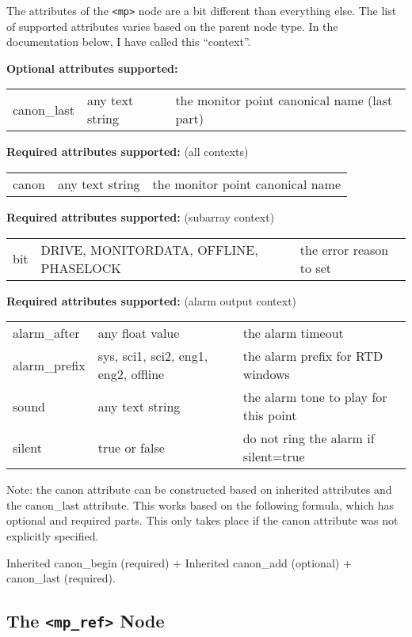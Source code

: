 \documentclass[letterpaper,12pt,oneside,pdftex]{article}
\newcommand{\optattrs}{\textbf{Optional attributes supported:}}
\newcommand{\reqattrs}{\textbf{Required attributes supported:}}
\begin{document}
The attributes of the \verb|<mp>| node are a bit different than everything else.
The list of supported attributes varies based on the parent node type. In the
documentation below, I have called this ``context''.

\optattrs \\
\begin{tabular}{lll}
canon\_last & any text string   & the monitor point canonical name (last part) \\
\end{tabular}

\reqattrs{} (all contexts) \\
\begin{tabular}{lll}
canon       & any text string   & the monitor point canonical name \\
\end{tabular}

\reqattrs{} (subarray context) \\
\begin{tabular}{lll}
bit & DRIVE, MONITORDATA, OFFLINE, PHASELOCK & the error reason to set \\
\end{tabular}

\reqattrs{} (alarm output context) \\
\begin{tabular}{lll}
alarm\_after& any float value   & the alarm timeout \\
alarm\_prefix&sys, sci1, sci2, eng1, eng2, offline & the alarm prefix for RTD windows \\
sound       & any text string   & the alarm tone to play for this point \\
silent      & true or false     & do not ring the alarm if silent=true \\
\end{tabular}

Note: the canon attribute can be constructed based on inherited attributes and
the canon\_last attribute. This works based on the following formula, which has
optional and required parts. This only takes place if the canon attribute was
not explicitly specified.

Inherited canon\_begin (required) + Inherited canon\_add (optional) +
canon\_last (required).

\subsection{The \texttt{<mp\_ref>} Node}
\end{document}
